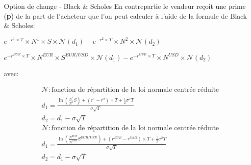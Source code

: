 \documentclass{beamer}
\begin{document}
\begin{frame}{Option de change - Black \& Scholes }
En contrepartie le vendeur reçoit une prime (\textbf{p}) de la part de l'acheteur que l'on peut calculer à l'aide de la formule de Black \& Scholes:\\
\vspace{0.5cm}
\begin{overprint}
\begin{center}
$e^{-r^1 \times T} \times N^1 \times S \times \mathcal{N}(d_1)-e^{-r^2 \times T} \times N^2 \times \mathcal{N}(d_2)$
\end{center}
\begin{center}
$e^{-r^{EUR} \times T} \times N^{EUR} \times S^{EUR/USD} \times \mathcal{N}(d_1)-e^{-r^{USD} \times T} \times N^{USD} \times \mathcal{N}(d_2)$
\end{center}
\end{overprint}
avec:\\
\begin{overprint}
\[
\begin{split}
&\mathcal{N} : \text{fonction de répartition de la loi normale centrée réduite}\\
&d_1=\frac{\ln\left( \frac{N^1}{N^2} S \right)+(r^1-r^2) \times T+\frac{1}{2}\sigma^2 T}{\sigma\sqrt{T}}\\
&d_2=d_1-\sigma\sqrt{T}
\end{split}
\]
\[
\begin{split}
&\mathcal{N} : \text{fonction de répartition de la loi normale centrée réduite}\\
&d_1=\frac{\ln\left( \frac{N^{EUR}}{N^{USD}} S^{EUR/USD} \right)+(r^{EUR}-r^{USD}) \times T+\frac{1}{2}\sigma^2 T}{\sigma\sqrt{T}}\\
&d_2=d_1-\sigma\sqrt{T}
\end{split}
\]
\end{overprint}
\end{frame}
\end{document}
